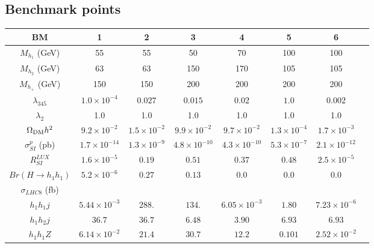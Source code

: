\documentclass[12pt,a4paper]{article}
\begin{document}
\subsection{Benchmark points}

\begin{table}[htb]
\centering
\begin{tabular}{|c||c|c|c|c|c|c|c|}
\hline
 {\bf BM}                       &  {\bf 1}  		& {\bf 2}  	   	   & {\bf 3}  		& {\bf 4}  		    & {\bf 5}     	    &  {\bf 6}  \\
  \hline\hline 
  $M_{h_{1}}$ (GeV)     	& 55      		& 55 			& 50 		      & 70		       & 100	      	      &100 \\
  \hline
  $M_{h_{2}}$ (GeV)     	& 63      		& 63 			&150  		      & 170	       	       & 105		      &105 \\
  \hline
  $M_{h_{+}}$ (GeV)   		& 150     		& 150 			&200  	  	      & 200		       & 200	     	      &200 \\
  \hline
  $\lambda_{345}$       	& $1.0\times10^{-4}$ 	 & $0.027$  		 & $0.015$ 		& $0.02$ 		& $1.0$  		& $0.002$	   \\
  \hline
  $\lambda_{2}$         	&  1.0    		& 1.0		        & 1.0	    	      & 1.0		       & 1.0		      & 1.0 \\ 
  \hline	
  $\Omega_{\rm DM} h^2$          	& $9.2 \times 10^{-2}$  & $1.5 \times 10^{-2}$   & $9.9 \times 10^{-2}$ & $9.7 \times 10^{-2}$	& $1.3 \times 10^{-4}$  &  $1.7 \times 10^{-3}$ \\
  \hline 
  $\sigma_{SI}^p$ (pb)    	& $1.7 \times 10^{-14}$ &  $1.3 \times 10^{-9}$  & $4.8 \times 10^{-10}$& $4.3 \times 10^{-10}$ & $5.3 \times 10^{-7}$  &  $2.1 \times 10^{-12}$ \\
  $R_{SI}^{LUX}$     	        & $1.6\times 10^{-5}$   &  $0.19$		 & $0.51$  		& $0.37$  		& $0.48$  		& $2.5  \times 10^{-5} $ \\
 \hline 
  $Br(H\to h_1 h_1)$     	& $5.2\times 10^{-6}$ 	&  $0.27$  		& $0.13$  		& $0.0$  		& $0.0$		 	&  $0.0$ \\
 \hline 
  $\sigma_{LHC8}$ (fb) &&&&&&\\
  ${h_1 h_1 j}$  		& $5.44\times 10^{-3}$ 	&  $288.$  		& $134.$  		& $6.05\times 10^{-3}$ 	&  $1.80$ 		&  $7.23\times 10^{-6}$ \\
  ${h_1 h_2 j}$  		& $36.7$      		&  $36.7$ 		& $6.48$  		& $3.90$ 		&  $6.93$ 		&  $6.93$ \\
  ${h_1h_1 Z}$  		& $6.14\times 10^{-2}$  &  $21.4$  		& $30.7$  		& $12.2$		&  $0.101$ 		&  $2.52\times 10^{-2}$ \\

\end{tabular}
\end{table}
\end{document}
